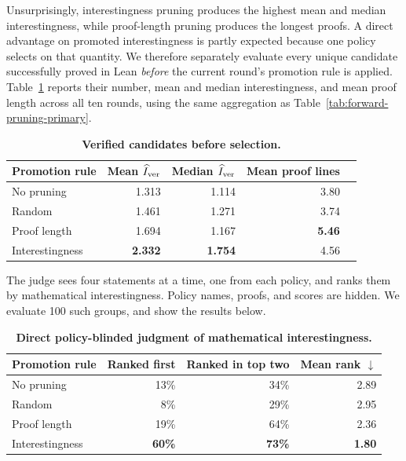 Unsurprisingly, interestingness pruning produces the highest mean and median interestingness,
while proof-length pruning produces the longest proofs.
A direct advantage on promoted interestingness is partly expected because one
policy selects on that quantity. We therefore separately evaluate every unique
candidate successfully proved in Lean \emph{before} the current round's
promotion rule is applied. Table~\ref{tab:forward-pruning-candidates} reports
their number, mean and median interestingness, and mean proof length across all
ten rounds, using the same aggregation as
Table~\ref{tab:forward-pruning-primary}.

\begin{table}[H]
  \centering
  \small
  \begin{tabular}{@{}lrrrr@{}}
    \toprule
    Promotion rule  & Mean $\widehat I_{\rm ver}$ & Median $\widehat I_{\rm ver}$ & Mean proof lines \\
    \midrule
    No pruning      & 1.313 & 1.114 & 3.80 \\
    Random          & 1.461 & 1.271 & 3.74 \\
    Proof length    & 1.694 & 1.167 & \textbf{5.46} \\
    Interestingness & \textbf{2.332} & \textbf{1.754} & 4.56 \\
    \bottomrule
  \end{tabular}
  \caption{\textbf{Verified candidates before selection.}}
  \label{tab:forward-pruning-candidates}
\end{table}


The judge sees four statements at a time, one from each policy, and ranks them by mathematical interestingness. Policy names, proofs, and scores are hidden. We evaluate 100 such groups, and show the results below.

\begin{table}[H]
  \centering
  \small
  \begin{tabular}{@{}lrrr@{}}
    \toprule
    Promotion rule & Ranked first & Ranked in top two & Mean rank $\downarrow$ \\
    \midrule
    No pruning      & 13\% & 34\% & 2.89 \\
    Random          & 8\%  & 29\% & 2.95 \\
    Proof length    & 19\% & 64\% & 2.36 \\
    Interestingness & \textbf{60\%} & \textbf{73\%} & \textbf{1.80} \\
    \bottomrule
  \end{tabular}
  \caption{\textbf{Direct policy-blinded judgment of mathematical
  interestingness.}}
  \label{tab:forward-pruning-interest-judge}
\end{table}

